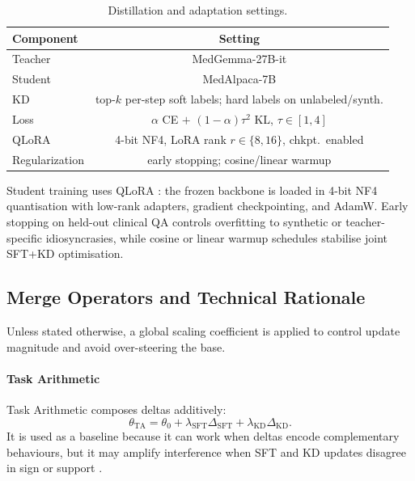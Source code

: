\documentclass[conference]{IEEEtran}
\begin{document}
\begin{table}[h!]
\centering
\caption{Distillation and adaptation settings.}
\label{tab:settings}
\begin{tabular}{lc}
\toprule
\textbf{Component} & \textbf{Setting} \\
\midrule
Teacher & MedGemma-27B-it \cite{google2025medgemma} \\
Student & MedAlpaca-7B \cite{han2023medalpaca} \\
KD & top-$k$ per-step soft labels; hard labels on unlabeled/synth. \\
Loss & $\alpha$ CE $+$ $(1\!-\!\alpha)\tau^2$ KL, $\tau\!\in\![1,4]$ \\
QLoRA & 4-bit NF4, LoRA rank $r\!\in\!\{8,16\}$, chkpt.\ enabled \\
Regularization & early stopping; cosine/linear warmup \\
\bottomrule
\end{tabular}
\vspace{-0.5em}
\end{table}

Student training uses QLoRA \cite{dettmers2023qlora}: the frozen backbone is loaded in 4-bit NF4 quantisation with low-rank adapters, gradient checkpointing, and AdamW. Early stopping on held-out clinical QA controls overfitting to synthetic or teacher-specific idiosyncrasies, while cosine or linear warmup schedules stabilise joint SFT+KD optimisation.


\subsection{Merge Operators and Technical Rationale}
\label{app:merge-operators}

Unless stated otherwise, a global scaling coefficient is applied to control update magnitude and avoid over-steering the base.

\paragraph{Task Arithmetic}
Task Arithmetic composes deltas additively:
\begin{equation}
\theta_{\text{TA}} = \theta_0 + \lambda_{\text{SFT}}\Delta_{\text{SFT}} + \lambda_{\text{KD}}\Delta_{\text{KD}}.
\end{equation}
It is used as a baseline because it can work when deltas encode complementary behaviours, but it may amplify interference when SFT and KD updates disagree in sign or support \cite{ilharco2022editing}.
\end{document}

